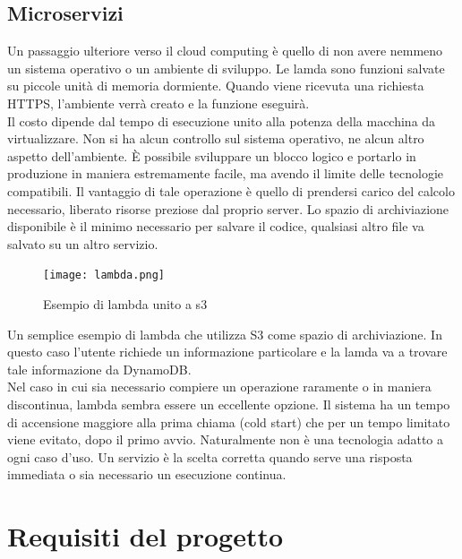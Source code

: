 \documentclass[12pt]{article}
\begin{document}
\subsection{Microservizi}
Un passaggio ulteriore verso il cloud computing è quello di non avere nemmeno 
un sistema operativo o un ambiente di sviluppo.
Le lamda sono funzioni salvate su piccole unità di memoria dormiente. 
Quando viene ricevuta una richiesta HTTPS, l'ambiente verrà creato e la 
funzione eseguirà. 
\\ Il costo dipende dal tempo di esecuzione unito alla potenza della macchina 
da virtualizzare. 
Non si ha alcun controllo sul sistema operativo, ne alcun altro aspetto 
dell'ambiente.
È possibile sviluppare un blocco logico e portarlo in produzione in maniera 
estremamente facile, ma avendo il limite delle tecnologie compatibili.
Il vantaggio di tale operazione è quello di prendersi carico del calcolo 
necessario, liberato risorse preziose dal proprio server. 
Lo spazio di archiviazione disponibile è il minimo necessario per salvare il 
codice, qualsiasi altro file va salvato su un altro servizio.
\begin{figure}[H]
\texttt{[image: lambda.png]}
\centering
\caption{Esempio di lambda unito a s3}
\end{figure}
Un semplice esempio di lambda che utilizza S3 come spazio di archiviazione. 
In questo caso l'utente richiede un informazione particolare e la lamda 
va a trovare tale informazione da DynamoDB. 
\\ Nel caso in cui sia necessario compiere un operazione raramente o in maniera 
discontinua, lambda sembra essere un eccellente opzione. 
Il sistema ha un tempo di accensione maggiore alla prima chiama (cold start)
che per un tempo limitato viene evitato, dopo il primo avvio.
Naturalmente non è una tecnologia adatto a ogni caso d'uso. 
Un servizio è la scelta corretta 
quando serve una risposta immediata o sia necessario un esecuzione continua.

\section{Requisiti del progetto}
\end{document}
